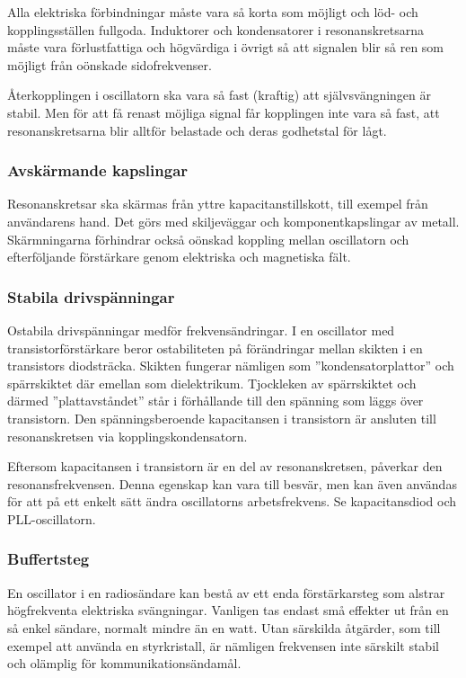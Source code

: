 Alla elektriska förbindningar måste vara så korta som möjligt och löd- och
kopplingsställen fullgoda.
Induktorer och kondensatorer i resonanskretsarna måste vara förlustfattiga
och högvärdiga i övrigt så att signalen blir så ren som möjligt från oönskade
sidofrekvenser.

Återkopplingen i oscillatorn ska vara så fast (kraftig) att självsvängningen
är stabil.
Men för att få renast möjliga signal får kopplingen inte vara så fast,
att resonanskretsarna blir alltför belastade och deras godhetstal för lågt.

\subsubsection{Avskärmande kapslingar}

Resonanskretsar ska skärmas från yttre kapacitanstillskott, till exempel från
användarens hand.
Det görs med skiljeväggar och komponentkapslingar av metall.
Skärmningarna förhindrar också oönskad koppling mellan oscillatorn och
efterföljande förstärkare genom elektriska och magnetiska fält.

\newpage
\subsubsection{Stabila drivspänningar}

Ostabila drivspänningar medför frekvensändringar.
I en oscillator med transistorförstärkare beror ostabiliteten på förändringar
mellan skikten i en transistors diodsträcka.
Skikten fungerar nämligen som ''kondensatorplattor'' och spärrskiktet där
emellan som dielektrikum.
Tjockleken av spärrskiktet och därmed ''plattavståndet'' står i förhållande
till den spänning som läggs över transistorn.
Den spänningsberoende kapacitansen i transistorn är ansluten till
resonanskretsen via kopplingskondensatorn.

Eftersom kapacitansen i transistorn är en del av resonanskretsen, påverkar
den resonansfrekvensen.
Denna egenskap kan vara till besvär, men kan även användas för att på ett
enkelt sätt ändra oscillatorns arbetsfrekvens.
Se kapacitansdiod och PLL-oscillatorn.

\subsubsection{Buffertsteg}
\label{buffertsteg}

En oscillator i en radiosändare kan bestå av ett enda förstärkarsteg
som alstrar högfrekventa elektriska svängningar.
Vanligen tas endast små effekter ut från en så enkel sändare, normalt mindre än
en watt.
Utan särskilda åtgärder, som till exempel att använda en styrkristall, är
nämligen frekvensen inte särskilt stabil och olämplig för kommunikationsändamål.

